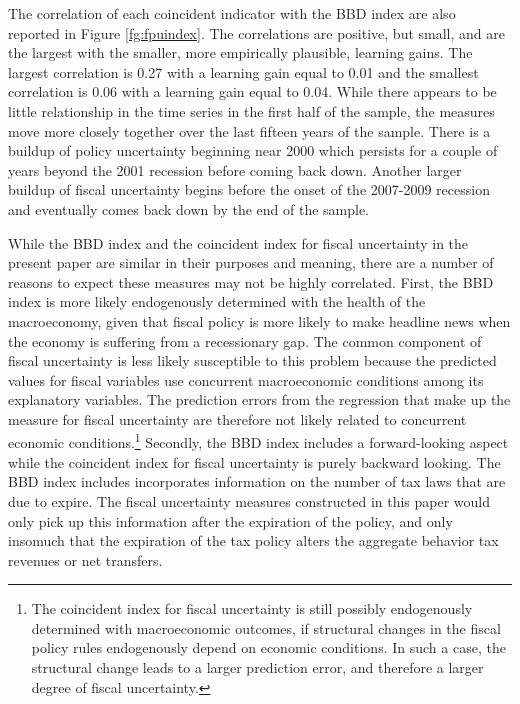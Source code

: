 \documentclass[11pt]{article}
\begin{document}
The correlation of each coincident indicator with the BBD index are also reported in Figure \ref{fg:fpuindex}.  The correlations are positive, but small, and are the largest with the smaller, more empirically plausible, learning gains.  The largest correlation is 0.27 with a learning gain equal to 0.01 and the smallest correlation is 0.06 with a learning gain equal to 0.04.  While there appears to be little relationship in the time series in the first half of the sample, the measures move more closely together over the last fifteen years of the sample.  There is a buildup of policy uncertainty beginning near 2000 which persists for a couple of years beyond the 2001 recession before coming back down.  Another larger buildup of fiscal uncertainty begins before the onset of the 2007-2009 recession and eventually comes back down by the end of the sample.  

While the BBD index and the coincident index for fiscal uncertainty in the present paper are similar in their purposes and meaning, there are a number of reasons to expect these measures may not be highly correlated.  First, the BBD index is more likely endogenously determined with the health of the macroeconomy, given that fiscal policy is more likely to make headline news when the economy is suffering from a recessionary gap.  The common component of fiscal uncertainty is less likely susceptible to this problem because the predicted values for fiscal variables use concurrent macroeconomic conditions among its explanatory variables.  The prediction errors from the regression that make up the measure for fiscal uncertainty are therefore not likely related to concurrent economic conditions.\footnote{The coincident index for fiscal uncertainty is still possibly endogenously determined with macroeconomic outcomes, if structural changes in the fiscal policy rules endogenously depend on economic conditions.  In such a case, the structural change leads to a larger prediction error, and therefore a larger degree of fiscal uncertainty.} Secondly, the BBD index includes a forward-looking aspect while the coincident index for fiscal uncertainty is purely backward looking.  The BBD index includes incorporates information on the number of tax laws that are due to expire.  The fiscal uncertainty measures constructed in this paper would only pick up this information after the expiration of the policy, and only insomuch that the expiration of the tax policy alters the aggregate behavior tax revenues or net transfers. 
\end{document}
